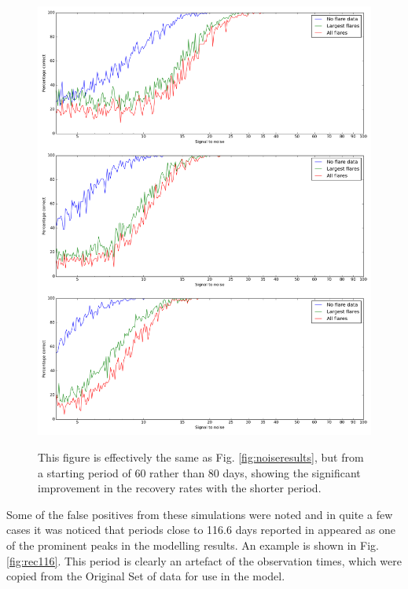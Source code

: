 \begin{figure}[!htbp]
\begin{center}
\includegraphics[scale=0.25]{Figures/Np60.png} \\
\end{center}
\caption{This figure is effectively the same as Fig. \ref{fig:noiseresults}, but from a starting period of 60 rather
  than 80 days, showing the significant improvement in the recovery rates with the shorter period.}
\protect\label{fig:noiseresults60}
\end{figure}

Some of the false positives from these simulations were noted and in quite a few cases it was noticed that periods close
to 116.6 days reported in \citet[Table 3]{suarezmascareno15} appeared as one of the prominent peaks in the modelling
results. An example is shown in Fig. \ref{fig:rec116}. This period is clearly an artefact of the observation times,
which were copied from the Original Set of {\harps} data for use in the model. 

